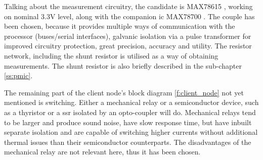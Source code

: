 \documentclass[journal]{IEEEtran}
\begin{document}
Talking about the measurement circuitry, the candidate is MAX78615 \cite{online:MAX78615}, working on nominal 3.3V level, along with the companion \gls{ic} MAX78700 \cite{online:MAX78700}. The couple has been chosen, because it provides multiple ways of communication with the processor (buses/serial interfaces), galvanic isolation via a pulse transformer for improved circuitry protection, great precision, accuracy and utility. The resistor network, including the shunt resistor is utilised as a way of obtaining measurements. The shunt resistor is also briefly described in the sub-chapter \ref{ss:pmic}.

The remaining part of the client node's block diagram \ref{f:client_node} not yet mentioned is switching. Either a mechanical relay or a semiconductor device, such as a thyristor or a \gls{ssr} isolated by an opto-coupler\cite{trzynadlowski2015introduction} will do. Mechanical relays tend to be larger and produce sound noise, have slow response time, but have inbuilt separate isolation and are capable of switching higher currents without additional thermal issues than their semiconductor counterparts\cite{blume2008electric}. The disadvantages of the mechanical relay are not relevant here, thus it has been chosen.
\end{document}
